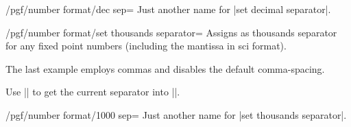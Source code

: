 \begin{stylekey}{/pgf/number format/dec sep=}
  Just another name for |set decimal separator|.
\end{stylekey}

\begin{key}{/pgf/number format/set thousands separator=}
  Assigns  as thousands separator for any fixed point
  numbers (including the mantissa in sci format). 

\begin{codeexample}[]
\end{codeexample}
\begin{codeexample}[]
\end{codeexample}

\begin{codeexample}[]
\end{codeexample}
\begin{codeexample}[]
\end{codeexample}
\begin{codeexample}[]
\end{codeexample}
  The last example employs commas and disables the default
  comma-spacing. 

  Use |\value| 
  to get the current separator into |\value|. 
\end{key}

\begin{stylekey}{/pgf/number format/1000 sep=}
  Just another name for |set thousands separator|.
\end{stylekey}

